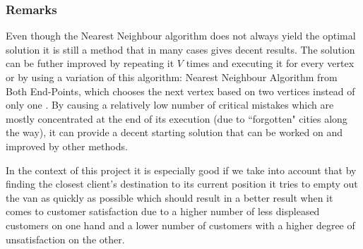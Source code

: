 \subsubsection{Remarks}
Even though the Nearest Neighbour algorithm does not always yield the optimal solution it is still a method that in many cases gives decent results.
The solution can be futher improved by repeating it $V$ times and executing it for every vertex or by using a variation of this algorithm: Nearest Neighbour Algorithm from Both End-Points, which chooses the next vertex based on two vertices instead of only one \cite{NN-algorithm}.
By causing a relatively low number of critical mistakes which are mostly concentrated at the end of its execution (due to ``forgotten" cities along the way), it can provide a decent starting solution that can be worked on and improved by other methods.\par
In the context of this project it is especially good if we take into account that by finding the closest client's destination to its current position it tries to empty out the van as quickly as possible
which should result in a better result when it comes to customer satisfaction due to a higher number of less displeased customers on one hand and a lower number of customers with a higher degree of unsatisfaction on the other.
\par
